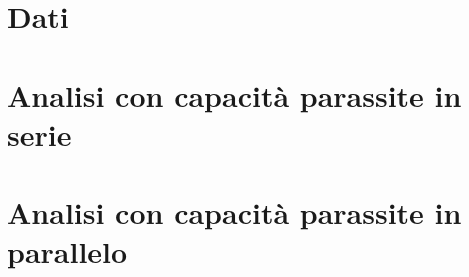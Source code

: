 \chapter{Dati}
\chapter{Analisi con capacità parassite in serie}
\chapter{Analisi con capacità parassite in parallelo}


